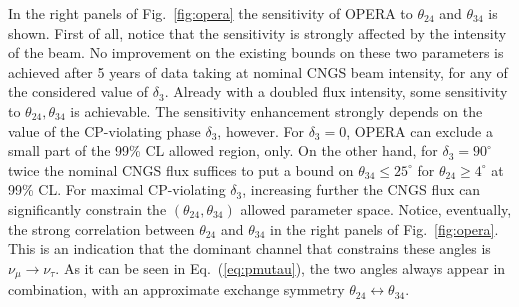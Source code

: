 \documentclass[12pt]{elsart}
\begin{document}
In the right panels of Fig.~\ref{fig:opera} the sensitivity of OPERA
to $\theta_{24}$ and $\theta_{34}$ is shown. First of all, notice that
the sensitivity is strongly affected by the intensity of the beam.  No
improvement on the existing bounds on these two parameters is achieved
after 5 years of data taking at nominal CNGS beam intensity, for any
of the considered value of $\delta_3$. Already with a doubled flux
intensity, some sensitivity to $\theta_{24}, \theta_{34}$ is
achievable. The sensitivity enhancement strongly depends on the value
of the CP-violating phase $\delta_3$, however.  For $\delta_3 = 0$,
OPERA can exclude a small part of the 99\% CL allowed region, only. 
On the other hand, for $\delta_3 = 90^\circ$ twice the nominal CNGS
flux suffices to put a bound on $\theta_{34} \leq 25^\circ$ for
$\theta_{24} \geq 4^\circ$ at 99\% CL. For maximal CP-violating
$\delta_3$, increasing further the CNGS flux can significantly
constrain the $(\theta_{24},\theta_{34})$ allowed parameter space.
Notice, eventually, the strong correlation between $\theta_{24}$ and
$\theta_{34}$ in the right panels of Fig.~\ref{fig:opera}. This is an
indication that the dominant channel that constrains these angles is
$\nu_\mu \to \nu_\tau$. As it can be seen in Eq.~(\ref{eq:pmutau}), 
the two angles always appear in combination, with an approximate
exchange symmetry $\theta_{24} \leftrightarrow \theta_{34}$.
\end{document}

